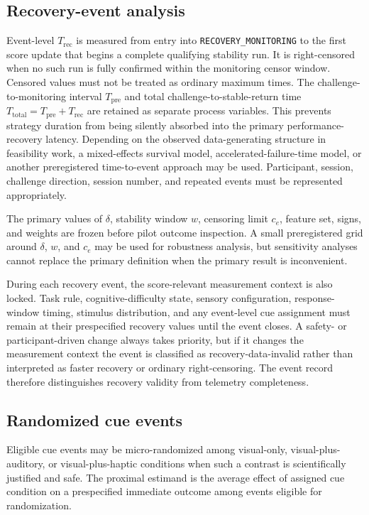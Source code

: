 \subsection{Recovery-event analysis}

Event-level \(T_{\mathrm{rec}}\) is measured from entry into \texttt{RECOVERY\_MONITORING} to the first score update that begins a complete qualifying stability run. It is right-censored when no such run is fully confirmed within the monitoring censor window. Censored values must not be treated as ordinary maximum times. The challenge-to-monitoring interval \(T_{\mathrm{pre}}\) and total challenge-to-stable-return time \(T_{\mathrm{total}}=T_{\mathrm{pre}}+T_{\mathrm{rec}}\) are retained as separate process variables. This prevents strategy duration from being silently absorbed into the primary performance-recovery latency. Depending on the observed data-generating structure in feasibility work, a mixed-effects survival model, accelerated-failure-time model, or another preregistered time-to-event approach may be used. Participant, session, challenge direction, session number, and repeated events must be represented appropriately.

The primary values of \(\delta\), stability window \(w\), censoring limit \(c_e\), feature set, signs, and weights are frozen before pilot outcome inspection. A small preregistered grid around \(\delta\), \(w\), and \(c_e\) may be used for robustness analysis, but sensitivity analyses cannot replace the primary definition when the primary result is inconvenient.

During each recovery event, the score-relevant measurement context is also locked. Task rule, cognitive-difficulty state, sensory configuration, response-window timing, stimulus distribution, and any event-level cue assignment must remain at their prespecified recovery values until the event closes. A safety- or participant-driven change always takes priority, but if it changes the measurement context the event is classified as recovery-data-invalid rather than interpreted as faster recovery or ordinary right-censoring. The event record therefore distinguishes recovery validity from telemetry completeness.

\subsection{Randomized cue events}

Eligible cue events may be micro-randomized among visual-only, visual-plus-auditory, or visual-plus-haptic conditions when such a contrast is scientifically justified and safe. The proximal estimand is the average effect of assigned cue condition on a prespecified immediate outcome among events eligible for randomization.

